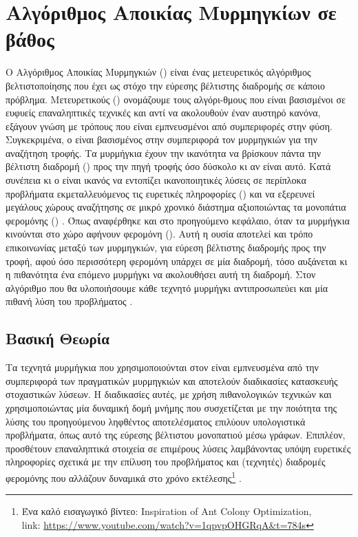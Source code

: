 \section{Αλγόριθμος Αποικίας Μυρμηγκίων σε βάθος}
Ο Αλγόριθμος Αποικίας Μυρμηγκιών () είναι ένας μετευρετικός αλγόριθμος βελτιστοποίησης που έχει ως στόχο την εύρεσης βέλτιστης διαδρομής σε κάποιο πρόβλημα. Μετευρετικούς () ονομάζουμε τους αλγόρι-θμους που είναι βασισμένοι σε ευφυείς επαναληπτικές τεχνικές και αντί να ακολουθούν έναν αυστηρό κανόνα, εξάγουν γνώση με τρόπους που είναι εμπνευσμένοι από συμπεριφορές στην φύση. Συγκεκριμένα, ο  είναι βασισμένος στην συμπεριφορά τον μυρμηγκιών για την αναζήτηση τροφής. 
Τα μυρμήγκια έχουν την ικανότητα να βρίσκουν πάντα την βέλτιστη διαδρομή () προς την πηγή τροφής όσο δύσκολο κι αν είναι αυτό. Κατά συνέπεια κι ο  είναι ικανός να εντοπίζει ικανοποιητικές λύσεις σε περίπλοκα προβλήματα εκμεταλλευόμενος τις ευρετικές πληροφορίες () και να εξερευνεί μεγάλους χώρους αναζήτησης σε μικρό χρονικό διάστημα αξιοποιώντας τα μονοπάτια φερομόνης () \cite{mavrovouniotis2017survey}. Όπως αναφέρθηκε και στο προηγούμενο κεφάλαιο, όταν τα μυρμήγκια κινούνται στο χώρο αφήνουν φερομόνη (). Αυτή η ουσία αποτελεί και τρόπο επικοινωνίας μεταξύ των μυρμηγκιών, για εύρεση βέλτιστης διαδρομής προς την τροφή, αφού όσο περισσότερη φερομόνη υπάρχει σε μία διαδρομή, τόσο αυξάνεται κι η πιθανότητα ένα επόμενο μυρμήγκι να ακολουθήσει αυτή τη διαδρομή. Στον αλγόριθμο που θα υλοποιήσουμε κάθε τεχνητό μυρμήγκι αντιπροσωπεύει και μία πιθανή λύση του προβλήματος \cite{mavrovouniotis2017survey}. 


\subsection{Βασική Θεωρία}
Τα τεχνητά μυρμήγκια που χρησιμοποιούνται στον  είναι εμπνευσμένα από την συμπεριφορά των πραγματικών μυρμηγκιών και αποτελούν διαδικασίες κατασκευής στοχαστικών λύσεων. Η διαδικασίες αυτές, με χρήση πιθανολογικών τεχνικών και χρησιμοποιώντας μία δυναμική δομή μνήμης που συσχετίζεται με την ποιότητα της λύσης του προηγούμενου ληφθέντος αποτελέσματος επιλύουν υπολογιστικά προβλήματα, όπως αυτό της εύρεσης βέλτιστου μονοπατιού μέσω γράφων. Επιπλέον, προσθέτουν επαναληπτικά στοιχεία σε επιμέρους λύσεις λαμβάνοντας υπόψη ευρετικές πληροφορίες σχετικά με την επίλυση του προβλήματος και (τεχνητές) διαδρομές φερομόνης που αλλάζουν δυναμικά στο χρόνο εκτέλεσης\footnote{Ένα καλό εισαγωγικό βίντεο: Inspiration of Ant Colony Optimization,\\ link: \url{https://www.youtube.com/watch?v=1qpvpOHGRqA&t=784s}} \cite{dorigo2003ant} \cite{mavrovouniotis2017survey}.

